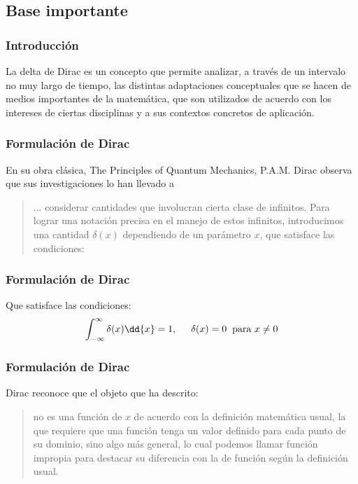\subsection{Base importante}
\begin{frame}
\frametitle{Introducción}
La delta de Dirac es un concepto que permite analizar, a través de un intervalo no muy largo de tiempo, las distintas adaptaciones conceptuales que se hacen de medios importantes de la matemática, que son utilizados de acuerdo con los intereses de ciertas disciplinas y a sus contextos concretos de aplicación.
\end{frame}
\begin{frame}
\frametitle{Formulación de Dirac}
En su obra clásica, The Principles of Quantum Mechanics, P.A.M. Dirac observa que sus investigaciones lo han llevado a
\begin{quote}
... considerar cantidades que involucran cierta clase de infinitos. Para lograr una notación precisa en el manejo de estos infinitos, introducimos una cantidad $\delta (x)$ dependiendo de un parámetro $x$, que satisface las condiciones:
\end{quote}
\end{frame}
\begin{frame}
\frametitle{Formulación de Dirac}
Que satisface las condiciones:
\begin{align*}
\int_{-\infty}^{\infty} \delta (x) \dd{x} = 1, \hspace{0.5cm} \delta(x) = 0 \hspace{0.2cm} \mbox{para } x \neq 0
\end{align*}
\end{frame}
\begin{frame}
\frametitle{Formulación de Dirac}
Dirac reconoce que el objeto que ha descrito:
\\
\bigskip
\begin{quote}
no es una función de $x$ de acuerdo con la definición matemática usual, la que requiere que una función tenga un valor definido para cada punto de su dominio, sino algo más general, lo cual podemos llamar función impropia para destacar su diferencia con la de función según la definición usual.
\end{quote}
\end{frame}
